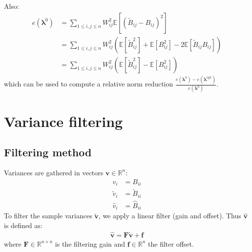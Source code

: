 \documentclass[12pt]{scrartcl}
\begin{document}
$  $\\
Also:
\begin{align}
e\left(\boldsymbol{\lambda}^0\right) & = \sum_{1 \le i,j \le n} W_{ij}^2 \mathbb{E}\left[ \left(\widetilde{B}_{ij} - B_{ij} \right)^2 \right] \nonumber \\
& = \sum_{1 \le i,j \le n} W_{ij}^2 \left(\mathbb{E}\left[ \widetilde{B}_{ij}^2 \right] + \mathbb{E}\left[ B^2_{ij} \right] - 2 \mathbb{E}\left[ \widetilde{B}_{ij} B_{ij} \right] \right) \nonumber \\
& = \sum_{1 \le i,j \le n} W_{ij}^2 \left(\mathbb{E}\left[ \widetilde{B}_{ij}^2 \right] - \mathbb{E}\left[ B^2_{ij} \right]\right)
\end{align}
which can be used to compute a relative norm reduction $\displaystyle \frac{e\left(\boldsymbol{\lambda}^0\right) - e\left(\boldsymbol{\lambda}^\mathrm{opt}\right)}{e\left(\boldsymbol{\lambda}^0\right)}$.

\clearpage

\section{Variance filtering}

\subsection{Filtering method}
Variances are gathered in vectors $\mathbf{v} \in \mathbb{R}^n$:
\begin{subequations}
\begin{align}
v_i & = B_{ii} \\
\widetilde{v}_i & = \widetilde{B}_{ii} \\
\widehat{v}_i & = \widehat{B}_{ii}
\end{align}
\end{subequations}
To filter the sample variances $\widetilde{\mathbf{v}}$, we apply a linear filter (gain and offset). Thus $\widehat{\mathbf{v}}$ is defined as:
\begin{align}
\label{eq:var_filter}
\widehat{\mathbf{v}} = \mathbf{F} \widetilde{\mathbf{v}} + \mathbf{f}
\end{align}
where $\mathbf{F} \in \mathbb{R}^{n \times n}$ is the filtering gain and $\mathbf{f} \in \mathbb{R}^n$ the filter offset.
\end{document}
